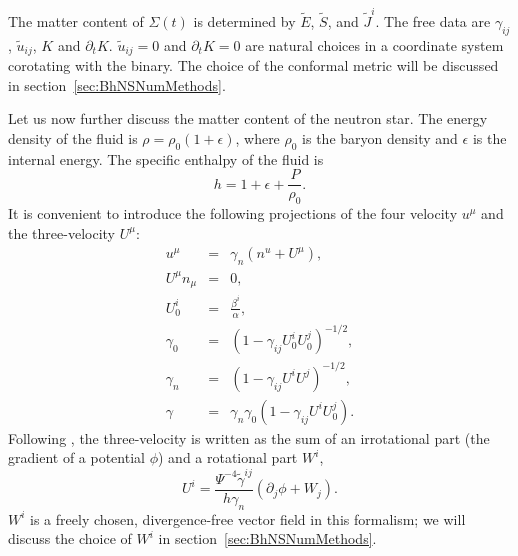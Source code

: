 The matter content of $\Sigma(t)$ is determined by $\tilde{E}$,
$\tilde{S}$, and $\tilde{J}^i$. The free data are $\gamma_{ij}$,
$\tilde{u}_{ij}$, $K$ and $\partial_t K$. $\tilde{u}_{ij}=0$ and
$\partial_t K=0$ are natural choices in a coordinate system corotating
with the binary. The
choice of the conformal metric will be discussed in section~\ref{sec:BhNSNumMethods}.

Let us now further discuss the matter content of the neutron star. The
energy density of the fluid is $\rho=\rho_0\left(1+\epsilon\right)$,
where $\rho_0$ is the baryon density and $\epsilon$ is the internal
energy. The specific enthalpy of the fluid is
\begin{equation}
h=1+\epsilon+\frac{P}{\rho_0}.
\end{equation}
It is convenient to introduce the following projections of the four
velocity $u^{\mu}$ and the three-velocity $U^{\mu}$:
\begin{eqnarray}
u^{\mu} &=& \gamma_n\left(n^u+U^\mu\right), \\
U^{\mu}n_{\mu}&=&0,\\
U^i_0 &=& \frac{\beta^i}{\alpha}, \\
\gamma_0 &=& \left(1 - \gamma_{ij}U^i_0U^j_0\right)^{-1/2}, \\
\gamma_n &=& \left(1 - \gamma_{ij}U^iU^j\right)^{-1/2}, \\
\gamma &=& \gamma_n\gamma_0\left(1-\gamma_{ij}U^iU^j_0\right).
\end{eqnarray}
Following \cite{Tichy:2011gw}, the three-velocity is written as the sum
of an irrotational part (the gradient of a potential $\phi$) and a
rotational part $W^i$,
\begin{equation}
U^i =
\frac{\Psi^{-4}\tilde{\gamma}^{ij}}{h\gamma_n}\left(\partial_j\phi+W_j\right).
\end{equation}
$W^i$ is a freely chosen, divergence-free vector field in this
formalism; we will discuss the choice of $W^i$ in section~\ref{sec:BhNSNumMethods}.

